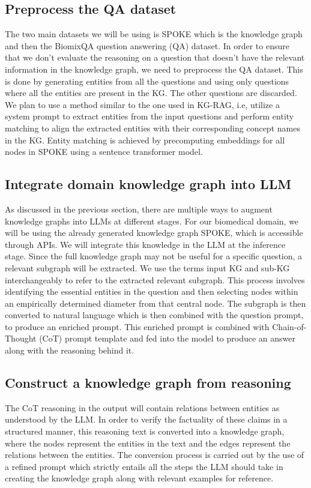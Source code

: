 \documentclass[11pt,a4paper]{article}
\begin{document}
\subsection{Preprocess the QA dataset}
The two main datasets we will be using is SPOKE \cite{10.1093/bioinformatics/btad080} which is the knowledge graph and then the BiomixQA \cite{soman2024biomedicalknowledgegraphoptimizedprompt} question answering (QA) dataset. In order to ensure that we don’t evaluate the reasoning on a question that doesn’t have the relevant information in the knowledge graph, we need to preprocess the QA dataset. This is done by generating entities from all the questions and using only questions where all the entities are present in the KG. The other questions are discarded. We plan to use a method similar to the one used in KG-RAG, i.e, utilize a  system prompt to extract entities from the input questions and perform entity matching to align the extracted entities with their corresponding concept names in the KG.  Entity matching is achieved by precomputing embeddings for all nodes in SPOKE using a sentence transformer model. 

\subsection{Integrate domain knowledge graph into LLM}
As discussed in the previous section, there are multiple ways to augment knowledge graphs into LLMs at different stages. For our biomedical domain, we will be using the already generated knowledge graph SPOKE, which is accessible through APIs. We will integrate this knowledge in the LLM at the inference stage. Since the full knowledge graph may not be useful for a specific question, a relevant subgraph will be extracted. We use the terms input KG and sub-KG interchangeably to refer to the extracted relevant subgraph. This process involves identifying the essential entities in the question and then selecting nodes within an empirically determined diameter from that central node. The subgraph is then converted to natural language which is then combined with the question prompt, to produce an enriched prompt. This enriched prompt is combined with Chain-of-Thought (CoT) prompt template and fed into the model to produce an answer along with the reasoning behind it.


\label{subsection:KG construction}
\subsection{Construct a knowledge graph from reasoning}
The CoT reasoning in the output will contain relations between entities as understood by the LLM. In order to verify the factuality of these claims in a structured manner, this reasoning text is converted into a knowledge graph, where the nodes represent the entities in the text and the edges represent the relations between the entities. The conversion process is carried out by the use of a refined prompt which strictly entails all the steps the LLM should take in creating the knowledge graph along with relevant examples for reference.
\end{document}
